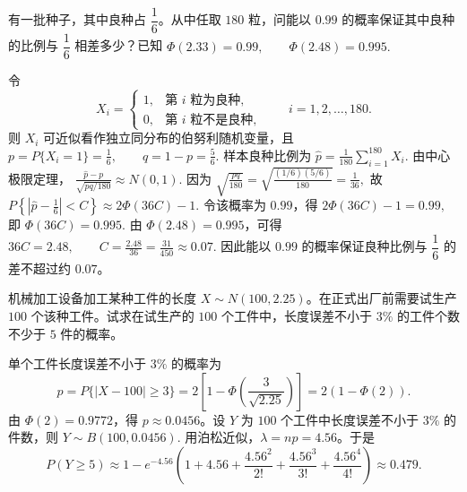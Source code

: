 \documentclass[lang=cn,11pt]{elegantbook}
\begin{document}
\begin{exercise}\label{exer:src-2017-a-06}
有一批种子，其中良种占 \(\dfrac16\)。从中任取 \(180\) 粒，问能以 \(0.99\) 的概率保证其中良种的比例与 \(\dfrac16\) 相差多少？已知
\(
\Phi(2.33)=0.99,\qquad \Phi(2.48)=0.995.
\)
\end{exercise}
\begin{solution}
令
\[
X_i=
\begin{cases}
1, & \text{第 }i\text{ 粒为良种},\\
0, & \text{第 }i\text{ 粒不是良种},
\end{cases}
\qquad i=1,2,\dots,180.
\]
则 \(X_i\) 可近似看作独立同分布的伯努利随机变量，且
\(
p=P\{X_i=1\}=\frac16,\qquad q=1-p=\frac56.
\)
样本良种比例为
\(
\hat p=\frac1{180}\sum_{i=1}^{180}X_i.
\)
由中心极限定理，
\(
\frac{\hat p-p}{\sqrt{pq/180}}\approx N(0,1).
\)
因为
\(
\sqrt{\frac{pq}{180}}
=\sqrt{\frac{(1/6)(5/6)}{180}}
=\frac1{36},
\)
故
\(
P\left\{\left|\hat p-\frac16\right|<C\right\}
\approx 2\Phi(36C)-1.
\)
令该概率为 \(0.99\)，得
\(
2\Phi(36C)-1=0.99,
\)
即
\(
\Phi(36C)=0.995.
\)
由 \(\Phi(2.48)=0.995\)，可得
\(
36C=2.48,\qquad C=\frac{2.48}{36}=\frac{31}{450}\approx0.07.
\)
因此能以 \(0.99\) 的概率保证良种比例与 \(\dfrac16\) 的差不超过约 \(0.07\)。
\end{solution}


\begin{exercise}\label{exer:src-2011-ab-b-06-2credit}
机械加工设备加工某种工件的长度 \(X\sim N(100,2.25)\)。在正式出厂前需要试生产 \(100\) 个该种工件。试求在试生产的 \(100\) 个工件中，长度误差不小于 \(3\%\) 的工件个数不少于 \(5\) 件的概率。
\end{exercise}
\begin{solution}
单个工件长度误差不小于 \(3\%\) 的概率为
\[
p=P\{|X-100|\ge3\}
=2\left[1-\Phi\left(\frac3{\sqrt{2.25}}\right)\right]
=2(1-\Phi(2)).
\]
由 \(\Phi(2)=0.9772\)，得 \(p\approx0.0456\)。设 \(Y\) 为 \(100\) 个工件中长度误差不小于 \(3\%\) 的件数，则
\(
Y\sim B(100,0.0456).
\)
用泊松近似，\(\lambda=np=4.56\)。于是
\[
P(Y\ge5)
\approx1-e^{-4.56}\left(1+4.56+\frac{4.56^2}{2!}
+\frac{4.56^3}{3!}+\frac{4.56^4}{4!}\right)
\approx0.479.
\]
\end{solution}
\end{document}
